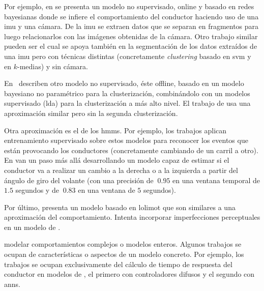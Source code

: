 Por ejemplo, en \cite{maye2011bayesian} se presenta un modelo no supervisado, online y basado en redes bayesianas donde se infiere el comportamiento del conductor haciendo uso de una \gls{imu} y una cámara. De la \gls{imu} se extraen datos que se separan en fragmentos para luego relacionarlos con las imágenes obtenidas de la cámara. Otro trabajo similar pueden ser \cite{van2013driver} el cual se apoya también en la segmentación de los datos extraídos de una \gls{imu} pero con técnicas distintas (concretamente \textit{clustering} basado en \gls{svm} y en $k$-medias) y sin cámara.

En~\cite{bando2013unsupervised} describen otro modelo no supervisado, éste offline, basado en un modelo bayesiano no paramétrico para la clusterización, combinándolo con un modelos supervisado (\gls{lda}) para la clusterización a más alto nivel. El trabajo de \cite{bender2015unsupervised} usa una aproximación similar pero sin la segunda clusterización.

Otra aproximación es el de los \glspl{hmm}. Por ejemplo, los trabajos \cite{Kuge2000,sekizawa2007modeling} aplican entrenamiento supervisado sobre estos modelos para reconocer los eventos que están provocando los conductores (concretamente cambiando de un carril a otro). En \cite{Hou2011} van un paso más allá desarrollando un modelo capaz de estimar si el conductor va a realizar un cambio a la derecha o a la izquierda a partir del ángulo de giro del volante (con una precisión de $~0.95$ en una ventana temporal de $1.5$ segundos y de $~0.83$ en una ventana de $5$ segundos).

Por último, \cite{Aghabayk2013} presenta un modelo basado en \gls{lolimot} que son similares a una aproximación \textit{} del comportamiento. Intenta incorporar imperfecciones perceptuales en un modelo de \textit{}.

 modelar comportamientos complejos o modelos enteros. Algunos trabajos se ocupan de características o aspectos de un modelo concreto. Por ejemplo, los trabajos \cite{Hatipkarasulu2002, zheng2013} se ocupan exclusivamente del cálculo de tiempo de respuesta del conductor en modelos de \textit{}, el primero con controladores difusos y el segundo con \glspl{ann}.
